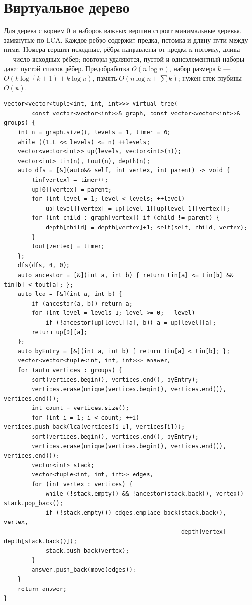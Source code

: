 \iffalse
\section{Виртуальное дерево}
Для дерева с корнем 0 и наборов важных вершин строит минимальные деревья, замкнутые по LCA.
Каждое ребро содержит предка, потомка и длину пути между ними.
Номера вершин исходные, рёбра направлены от предка к потомку, длина --- число исходных рёбер; повторы удаляются, пустой и одноэлементный наборы дают пустой список рёбер.
Предобработка $O(n\log n)$, набор размера $k$ --- $O(k\log(k+1)+k\log n)$, память $O(n\log n+\sum k)$; нужен стек глубины $O(n)$.
\begin{lstlisting}[name=virtual_tree]
vector<vector<tuple<int, int, int>>> virtual_tree(
        const vector<vector<int>>& graph, const vector<vector<int>>& groups) {
    int n = graph.size(), levels = 1, timer = 0;
    while ((1LL << levels) <= n) ++levels;
    vector<vector<int>> up(levels, vector<int>(n));
    vector<int> tin(n), tout(n), depth(n);
    auto dfs = [&](auto&& self, int vertex, int parent) -> void {
        tin[vertex] = timer++;
        up[0][vertex] = parent;
        for (int level = 1; level < levels; ++level)
            up[level][vertex] = up[level-1][up[level-1][vertex]];
        for (int child : graph[vertex]) if (child != parent) {
            depth[child] = depth[vertex]+1; self(self, child, vertex);
        }
        tout[vertex] = timer;
    };
    dfs(dfs, 0, 0);
    auto ancestor = [&](int a, int b) { return tin[a] <= tin[b] && tin[b] < tout[a]; };
    auto lca = [&](int a, int b) {
        if (ancestor(a, b)) return a;
        for (int level = levels-1; level >= 0; --level)
            if (!ancestor(up[level][a], b)) a = up[level][a];
        return up[0][a];
    };
    auto byEntry = [&](int a, int b) { return tin[a] < tin[b]; };
    vector<vector<tuple<int, int, int>>> answer;
    for (auto vertices : groups) {
        sort(vertices.begin(), vertices.end(), byEntry);
        vertices.erase(unique(vertices.begin(), vertices.end()), vertices.end());
        int count = vertices.size();
        for (int i = 1; i < count; ++i) vertices.push_back(lca(vertices[i-1], vertices[i]));
        sort(vertices.begin(), vertices.end(), byEntry);
        vertices.erase(unique(vertices.begin(), vertices.end()), vertices.end());
        vector<int> stack;
        vector<tuple<int, int, int>> edges;
        for (int vertex : vertices) {
            while (!stack.empty() && !ancestor(stack.back(), vertex)) stack.pop_back();
            if (!stack.empty()) edges.emplace_back(stack.back(), vertex,
                                                   depth[vertex]-depth[stack.back()]);
            stack.push_back(vertex);
        }
        answer.push_back(move(edges));
    }
    return answer;
}
\end{lstlisting}

